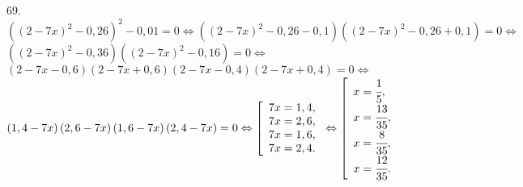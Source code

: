 69. $\left((2-7x)^2-0,26\right)^2-0,01=0\Leftrightarrow\left((2-7x)^2-0,26-0,1\right)\left((2-7x)^2-0,26+0,1\right)=0\Leftrightarrow$\\$
\left((2-7x)^2-0,36\right)\left((2-7x)^2-0,16\right)=0\Leftrightarrow$\\$
\left(2-7x-0,6\right)\left(2-7x+0,6\right)\left(2-7x-0,4\right)\left(2-7x+0,4\right)=0\Leftrightarrow$\\$
\left(1,4-7x\right)\left(2,6-7x\right)\left(1,6-7x\right)\left(2,4-7x\right)=0\Leftrightarrow
\left[\begin{array}{l}7x=1,4,\\ 7x=2,6,\\7x=1,6,\\7x=2,4.\end{array}\right.\Leftrightarrow
\left[\begin{array}{l}x=\cfrac{1}{5},\\ x=\cfrac{13}{35},\\x=\cfrac{8}{35},\\x=\cfrac{12}{35}.\end{array}\right.$\\
